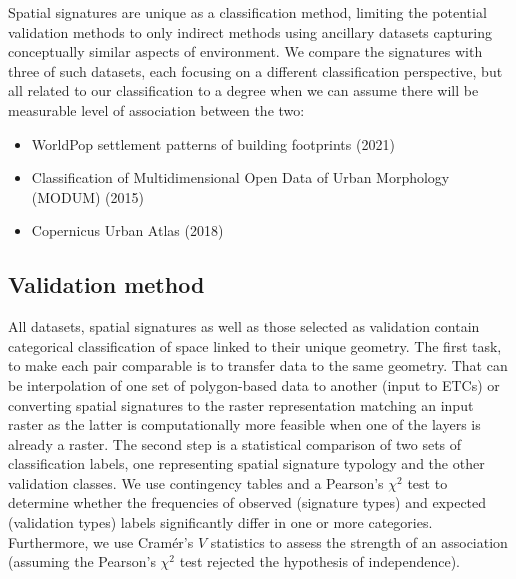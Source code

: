 Spatial signatures are unique as a classification method, limiting the potential
validation methods to only indirect methods using ancillary datasets capturing
conceptually similar aspects of environment. We compare the signatures with three of
such datasets, each focusing on a different classification perspective, but all related
to our classification to a degree when we can assume there will be measurable level of
association between the two:

\begin{itemize}
    \item WorldPop settlement patterns of building footprints (2021)\cite{jochem2021tools}
    \item Classification of Multidimensional Open Data of Urban Morphology (MODUM) (2015)\cite{alexiou2016}
    \item Copernicus Urban Atlas (2018)\cite{eea2018}
\end{itemize}


\subsection*{Validation method}
All datasets, spatial signatures as well as those selected as validation contain
categorical classification of space linked to their unique geometry. The first task, to
make each pair comparable is to transfer data to the same geometry. That can be
interpolation of one set of polygon-based data to another (input to ETCs) or converting
spatial signatures to the raster representation matching an input raster as the latter
is computationally more feasible when one of the layers is already a raster. The second
step is a statistical comparison of two sets of classification labels, one representing
spatial signature typology and the other validation classes. We use contingency tables
and a Pearson's $\chi^{2}$ test to determine whether the frequencies of observed
(signature types) and expected (validation types) labels significantly differ in one or
more categories. Furthermore, we use Cramér's $V$ statistics\cite{cramer2016mathematical} to assess the strength of
an association (assuming the Pearson's $\chi^{2}$ test rejected the hypothesis of
independence).


